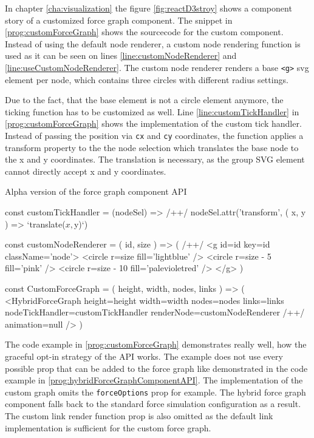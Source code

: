 In chapter \ref{cha:visualization} the figure \ref{fig:reactD3stroy} shows a component story of a customized force graph component. The snippet in \ref{prog:customForceGraph} shows the sourcecode for the custom component. Instead of using the default node renderer, a custom node rendering function is used as it can be seen on lines \ref{line:customNodeRenderer} and \ref{line:useCustomNodeRenderer}. The custom node renderer renders a base \texttt{<g>} svg element per node, which contains three circles with different radius settings. 

Due to the fact, that the base element is not a circle element anymore, the ticking function has to be customized as well. Line \ref{line:customTickHandler} in \ref{prog:customForceGraph} shows the implementation of the custom tick handler. Instead of passing the position via \texttt{cx} and \texttt{cy} coordinates, the function applies a transform property to the the node selection which translates the base node to the x and y coordinates. The translation is necessary, as the group SVG element cannot directly accept x and y coordinates.

\begin{program}
\caption{Alpha version of the force graph component API}
\label{prog:customForceGraph}
\begin{JsCode}
const customTickHandler = (nodeSel) => /+\label{line:customTickHandler}+/ 
  nodeSel.attr('transform', ({ x, y }) => `translate(${x},${y})`)

const customNodeRenderer = ({ id, size }) => ( /+\label{line:customNodeRenderer}+/ 
  <g id={id} key={id} className={'node'}>
    <circle r={size} fill={'lightblue'} />
    <circle r={size - 5} fill={'pink'} />
    <circle r={size - 10} fill={'palevioletred'} />
  </g>
)

const CustomForceGraph = ({ height, width, nodes, links }) => (
  <HybridForceGraph
    height={height}
    width={width}
    nodes={nodes}
    links={links}
    nodeTickHandler={customTickHandler}
    renderNode={customNodeRenderer} /+\label{line:useCustomNodeRenderer}+/ 
    animation={null}
  />
)
\end{JsCode}
\end{program}

The code example in \ref{prog:customForceGraph} demonstrates really well, how the graceful opt-in strategy of the API works. The example does not use every possible prop that can be added to the force graph like demonstrated in the code example in \ref{prog:hybridForceGraphComponentAPI}. The implementation of the custom graph omits the \texttt{forceOptions} prop for example. The hybrid force graph component falls back to the standard force simulation configuration as a result. The custom link render function prop is also omitted as the default link implementation is sufficient for the custom force graph.

